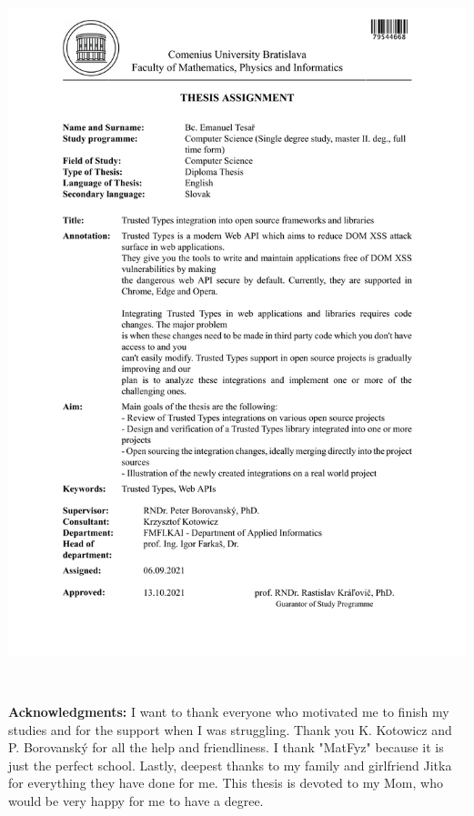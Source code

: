 \documentclass[12pt, twoside]{book}
\begin{document}
\newpage
\thispagestyle{empty}

\hspace{-2cm}\includegraphics[width=1.1\textwidth]{images/zadanie-en}


\frontmatter

\setcounter{page}{3}
\newpage
~

\vfill
{\bf Acknowledgments: } I want to thank everyone who motivated me to finish my studies and for the
support when I was struggling. Thank you K. Kotowicz and P. Borovanský for all the help and
friendliness. I thank "MatFyz" because it is just the perfect school. Lastly, deepest thanks to my
family and girlfriend Jitka for everything they have done for me. This thesis is devoted to my Mom,
who would be very happy for me to have a degree.
\end{document}
